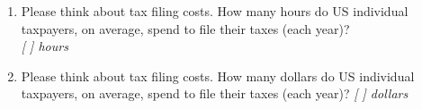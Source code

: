 \documentclass[11pt]{article}
\newcommand{\tk}[1]{\textcolor{orange}{#1}}
\begin{document}
\begin{enumerate}[resume]
    \item Please think about tax filing costs. How many hours do US individual taxpayers, on average, spend to file their taxes (each year)?\\
    \textit{[ ] hours} 
    \item Please think about tax filing costs. How many dollars do US individual taxpayers, on average, spend to file their taxes (each year)?
    \textit{[ ] dollars}
\end{enumerate}
\vspace{0.5em}
\end{document}
